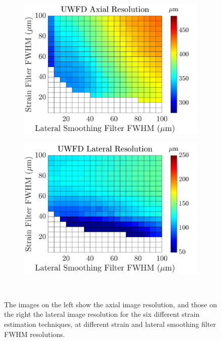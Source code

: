 \begin{figure}[h!]
\begin{subfigure}{0.49\textwidth}
		\includegraphics[width=\textwidth]{imageres_figs/uwfd_axial.png}
	\end{subfigure}
	\begin{subfigure}{0.49\textwidth}
		\centering
		\includegraphics[width=\textwidth]{imageres_figs/uwfd_lateral.png}
	\end{subfigure}
	\\
	\caption{The images on the left show the axial image resolution, and those on the right the lateral image resolution for the six different strain estimation techniques, at different strain and lateral smoothing filter FWHM resolutions.}
	\label{imageres_figs}
\end{figure}

